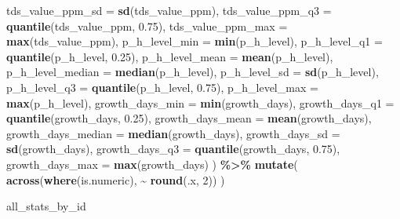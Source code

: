 \documentclass[
]{article}
\newenvironment{Shaded}{\begin{snugshade}}{\end{snugshade}}
\newcommand{\AttributeTok}[1]{\textcolor[rgb]{0.13,0.29,0.53}{#1}}
\newcommand{\DecValTok}[1]{\textcolor[rgb]{0.00,0.00,0.81}{#1}}
\newcommand{\FloatTok}[1]{\textcolor[rgb]{0.00,0.00,0.81}{#1}}
\newcommand{\FunctionTok}[1]{\textcolor[rgb]{0.13,0.29,0.53}{\textbf{#1}}}
\newcommand{\NormalTok}[1]{#1}
\newcommand{\SpecialCharTok}[1]{\textcolor[rgb]{0.81,0.36,0.00}{\textbf{#1}}}
\begin{document}
\begin{Shaded}
\begin{Highlighting}[]
            \AttributeTok{tds\_value\_ppm\_sd =} \FunctionTok{sd}\NormalTok{(tds\_value\_ppm),}
            \AttributeTok{tds\_value\_ppm\_q3 =} \FunctionTok{quantile}\NormalTok{(tds\_value\_ppm, }\FloatTok{0.75}\NormalTok{),}
            \AttributeTok{tds\_value\_ppm\_max =} \FunctionTok{max}\NormalTok{(tds\_value\_ppm),}
            \AttributeTok{p\_h\_level\_min =} \FunctionTok{min}\NormalTok{(p\_h\_level),}
            \AttributeTok{p\_h\_level\_q1 =} \FunctionTok{quantile}\NormalTok{(p\_h\_level, }\FloatTok{0.25}\NormalTok{),}
            \AttributeTok{p\_h\_level\_mean =} \FunctionTok{mean}\NormalTok{(p\_h\_level),}
            \AttributeTok{p\_h\_level\_median =} \FunctionTok{median}\NormalTok{(p\_h\_level),}
            \AttributeTok{p\_h\_level\_sd =} \FunctionTok{sd}\NormalTok{(p\_h\_level),}
            \AttributeTok{p\_h\_level\_q3 =} \FunctionTok{quantile}\NormalTok{(p\_h\_level, }\FloatTok{0.75}\NormalTok{),}
            \AttributeTok{p\_h\_level\_max =} \FunctionTok{max}\NormalTok{(p\_h\_level),}
            \AttributeTok{growth\_days\_min =} \FunctionTok{min}\NormalTok{(growth\_days),}
            \AttributeTok{growth\_days\_q1 =} \FunctionTok{quantile}\NormalTok{(growth\_days, }\FloatTok{0.25}\NormalTok{),}
            \AttributeTok{growth\_days\_mean =} \FunctionTok{mean}\NormalTok{(growth\_days),}
            \AttributeTok{growth\_days\_median =} \FunctionTok{median}\NormalTok{(growth\_days),}
            \AttributeTok{growth\_days\_sd =} \FunctionTok{sd}\NormalTok{(growth\_days),}
            \AttributeTok{growth\_days\_q3 =} \FunctionTok{quantile}\NormalTok{(growth\_days, }\FloatTok{0.75}\NormalTok{),}
            \AttributeTok{growth\_days\_max =} \FunctionTok{max}\NormalTok{(growth\_days)}
\NormalTok{  ) }\SpecialCharTok{\%\textgreater{}\%} 
  \FunctionTok{mutate}\NormalTok{(}
    \FunctionTok{across}\NormalTok{(}\FunctionTok{where}\NormalTok{(is.numeric), }\SpecialCharTok{\textasciitilde{}} \FunctionTok{round}\NormalTok{(.x, }\DecValTok{2}\NormalTok{))}
\NormalTok{         )}

\NormalTok{all\_stats\_by\_id}
\end{Highlighting}
\end{Shaded}
\end{document}

